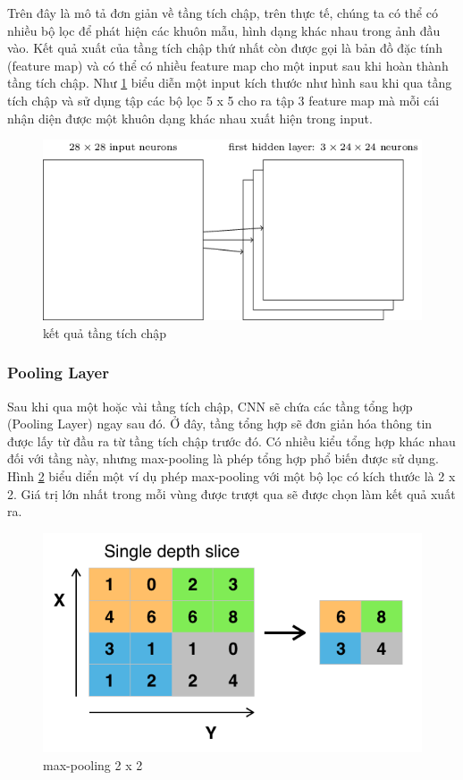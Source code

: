 		Trên đây là mô tả đơn giản về tầng tích chập, trên thực tế, chúng ta có thể có nhiều bộ lọc để phát hiện các khuôn mẫu, hình dạng khác nhau trong ảnh đầu vào. Kết quả xuất của tầng tích chập thứ nhất còn được gọi là bản đồ đặc tính (feature map) và có thể có nhiều feature map cho một input sau khi hoàn thành tầng tích chập. Như \ref{fig:feature_map} biểu diễn một input kích thước như hình sau khi qua tầng tích chập và sử dụng tập các bộ lọc 5 x 5 cho ra tập 3 feature map mà mỗi cái nhận diện được một khuôn dạng khác nhau xuất hiện trong input.
		\begin{figure}[h!]
			\centering
			\includegraphics[scale=0.5]{charts/feature_map.png}
			\caption{kết quả tầng tích chập \cite{img-input}}
			\label{fig:feature_map}
		\end{figure}
	
	\subsubsection{Pooling Layer}		
		Sau khi qua một hoặc vài tầng tích chập, CNN sẽ chứa các tầng tổng hợp (Pooling Layer) ngay sau đó. Ở đây, tầng tổng hợp sẽ đơn giản hóa thông tin được lấy từ đầu ra từ tầng tích chập trước đó. Có nhiều kiểu tổng hợp khác nhau đối với tầng này, nhưng max-pooling là phép tổng hợp phổ biến được sử dụng. Hình \ref{fig:max-pooling} biểu diển một ví dụ phép max-pooling với một bộ lọc có kích thước là 2 x 2. Giá trị lớn nhất trong mỗi vùng được trượt qua sẽ được chọn làm kết quả xuất ra.
		
		\begin{figure}[h!]
			\centering
			\includegraphics[scale=0.7]{charts/max_pooling.png}
			\caption{max-pooling 2 x 2 \cite{img-pool}}
			\label{fig:max-pooling}
		\end{figure}
		\pagebreak
		
